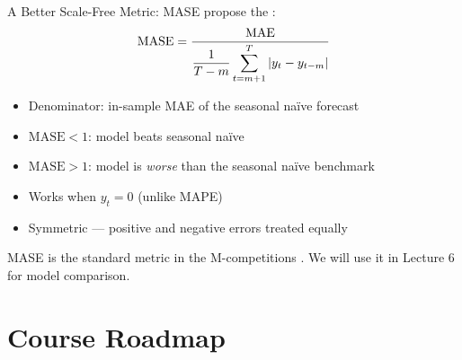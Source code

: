 \documentclass[aspectratio=169, 11pt]{beamer}
\begin{document}
\begin{frame}{A Better Scale-Free Metric: MASE}
  \textcite{Hyndman2006} propose the :
  \[
    \text{MASE} = \frac{\operatorname{MAE}}{\displaystyle\frac{1}{T-m}\sum_{t=m+1}^{T}|y_t - y_{t-m}|}
  \]
  \begin{itemize}
    \item Denominator: in-sample MAE of the seasonal na\"{i}ve forecast
    \item $\text{MASE} < 1$: model beats seasonal na\"{i}ve
    \item $\text{MASE} > 1$: model is \emph{worse} than the seasonal na\"{i}ve benchmark
    \item Works when $y_t = 0$ (unlike MAPE)
    \item Symmetric --- positive and negative errors treated equally
  \end{itemize}
  \vspace{0.2cm}
  \begin{keybox}
    MASE is the standard metric in the M-competitions \parencite{Makridakis2020}.
    We will use it in Lecture 6 for model comparison.
  \end{keybox}
\end{frame}

\section{Course Roadmap}

\end{document}
